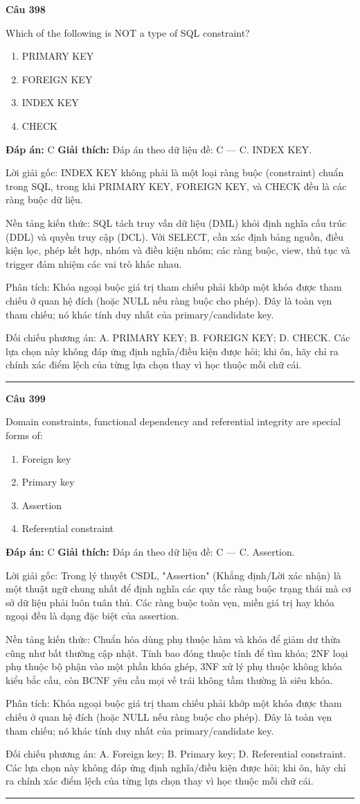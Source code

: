 \documentclass[11pt,a4paper]{article}
\newenvironment{question}[1]{%
  \par\vspace{1em}\noindent\textbf{\large Câu #1}\par\vspace{0.4em}
}{%
  \par\vspace{1em}\hrule\vspace{0.6em}
}
\newenvironment{choices}{%
  \begin{enumerate}[label=\textbf{\Alph*.},leftmargin=2.2em,itemsep=2pt,topsep=3pt]
}{%
  \end{enumerate}
}
\newcommand{\choice}{\item}
\begin{document}
\begin{question}{398}
Which of the following is NOT a type of SQL constraint?
\begin{choices}
\choice PRIMARY KEY
\choice FOREIGN KEY
\choice INDEX KEY
\choice CHECK
\end{choices}
\textbf{Đáp án:} C
\textbf{Giải thích:} Đáp án theo dữ liệu đề: C — C. INDEX KEY.

Lời giải gốc: INDEX KEY không phải là một loại ràng buộc (constraint) chuẩn trong SQL, trong khi PRIMARY KEY, FOREIGN KEY, và CHECK đều là các ràng buộc dữ liệu.

Nền tảng kiến thức: SQL tách truy vấn dữ liệu (DML) khỏi định nghĩa cấu trúc (DDL) và quyền truy cập (DCL). Với SELECT, cần xác định bảng nguồn, điều kiện lọc, phép kết hợp, nhóm và điều kiện nhóm; các ràng buộc, view, thủ tục và trigger đảm nhiệm các vai trò khác nhau.

Phân tích: Khóa ngoại buộc giá trị tham chiếu phải khớp một khóa được tham chiếu ở quan hệ đích (hoặc NULL nếu ràng buộc cho phép). Đây là toàn vẹn tham chiếu; nó khác tính duy nhất của primary/candidate key.

Đối chiếu phương án: A. PRIMARY KEY; B. FOREIGN KEY; D. CHECK. Các lựa chọn này không đáp ứng định nghĩa/điều kiện được hỏi; khi ôn, hãy chỉ ra chính xác điểm lệch của từng lựa chọn thay vì học thuộc mỗi chữ cái.
\end{question}

\begin{question}{399}
Domain constraints, functional dependency and referential integrity are special forms of:
\begin{choices}
\choice Foreign key
\choice Primary key
\choice Assertion
\choice Referential constraint
\end{choices}
\textbf{Đáp án:} C
\textbf{Giải thích:} Đáp án theo dữ liệu đề: C — C. Assertion.

Lời giải gốc: Trong lý thuyết CSDL, "Assertion" (Khẳng định/Lời xác nhận) là một thuật ngữ chung nhất để định nghĩa các quy tắc ràng buộc trạng thái mà cơ sở dữ liệu phải luôn tuân thủ. Các ràng buộc toàn vẹn, miền giá trị hay khóa ngoại đều là dạng đặc biệt của assertion.

Nền tảng kiến thức: Chuẩn hóa dùng phụ thuộc hàm và khóa để giảm dư thừa cũng như bất thường cập nhật. Tính bao đóng thuộc tính để tìm khóa; 2NF loại phụ thuộc bộ phận vào một phần khóa ghép, 3NF xử lý phụ thuộc không khóa kiểu bắc cầu, còn BCNF yêu cầu mọi vế trái không tầm thường là siêu khóa.

Phân tích: Khóa ngoại buộc giá trị tham chiếu phải khớp một khóa được tham chiếu ở quan hệ đích (hoặc NULL nếu ràng buộc cho phép). Đây là toàn vẹn tham chiếu; nó khác tính duy nhất của primary/candidate key.

Đối chiếu phương án: A. Foreign key; B. Primary key; D. Referential constraint. Các lựa chọn này không đáp ứng định nghĩa/điều kiện được hỏi; khi ôn, hãy chỉ ra chính xác điểm lệch của từng lựa chọn thay vì học thuộc mỗi chữ cái.
\end{question}
\end{document}
